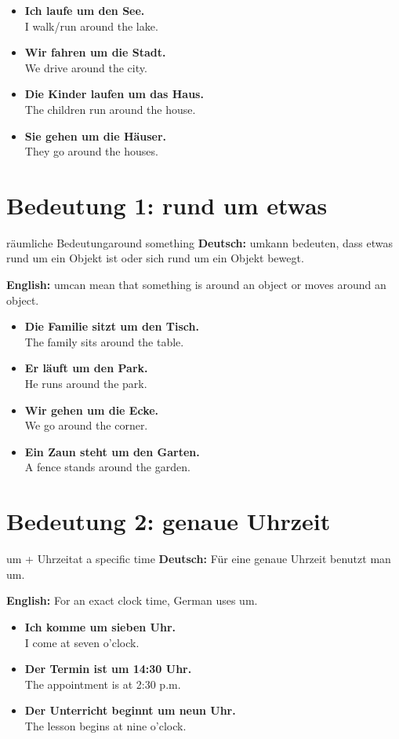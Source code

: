 \documentclass[a4paper,11pt]{article}
\newcommand{\GermanText}[1]{\textbf{Deutsch: }#1\par}
\newcommand{\EnglishText}[1]{{\small\color{SoftGray}\textbf{English: }#1\par}}
\newcommand{\ExampleItem}[2]{\item \textbf{#1}\\{\small\color{SoftGray}#2}}
\begin{document}
\begin{exbox}
\begin{itemize}
    \ExampleItem{Ich laufe um den See.}{I walk/run around the lake.}
    \ExampleItem{Wir fahren um die Stadt.}{We drive around the city.}
    \ExampleItem{Die Kinder laufen um das Haus.}{The children run around the house.}
    \ExampleItem{Sie gehen um die Häuser.}{They go around the houses.}
\end{itemize}
\end{exbox}

\section{Bedeutung 1: rund um etwas}

\begin{grammarentry}{räumliche Bedeutung}{around something}
\GermanText{\glqq um\grqq kann bedeuten, dass etwas rund um ein Objekt ist oder sich rund um ein Objekt bewegt.}
\EnglishText{\glqq um\grqq can mean that something is around an object or moves around an object.}
\end{grammarentry}

\begin{exbox}
\begin{itemize}
    \ExampleItem{Die Familie sitzt um den Tisch.}{The family sits around the table.}
    \ExampleItem{Er läuft um den Park.}{He runs around the park.}
    \ExampleItem{Wir gehen um die Ecke.}{We go around the corner.}
    \ExampleItem{Ein Zaun steht um den Garten.}{A fence stands around the garden.}
\end{itemize}
\end{exbox}

\section{Bedeutung 2: genaue Uhrzeit}

\begin{grammarentry}{um + Uhrzeit}{at a specific time}
\GermanText{Für eine genaue Uhrzeit benutzt man \glqq um\grqq.}
\EnglishText{For an exact clock time, German uses \glqq um\grqq.}
\end{grammarentry}

\begin{exbox}
\begin{itemize}
    \ExampleItem{Ich komme um sieben Uhr.}{I come at seven o'clock.}
    \ExampleItem{Der Termin ist um 14:30 Uhr.}{The appointment is at 2:30 p.m.}
    \ExampleItem{Der Unterricht beginnt um neun Uhr.}{The lesson begins at nine o'clock.}
\end{itemize}
\end{exbox}
\end{document}
